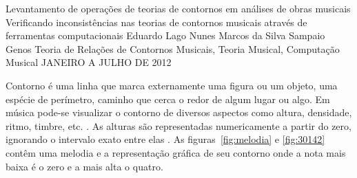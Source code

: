 \documentclass[11pt]{article}
\begin{document}
\graphicspath{{figs/}}


\dadosRelatorioFinal
{Levantamento de operações de teorias de contornos em análises de
  obras musicais}
{Verificando inconsistências nas teorias de contornos musicais através
  de ferramentas computacionais }
{Eduardo Lago Nunes}
{Marcos da Silva Sampaio}
{Genos}
{Teoria de Relações de Contornos Musicais, Teoria Musical, Computação Musical}
{JANEIRO A JULHO DE 2012}


\newpage

\setcounter{page}{1}
\onehalfspace

\label{sec:introducao}

Contorno é uma linha que marca externamente uma figura ou um objeto,
uma espécie de perímetro, caminho que cerca o redor de algum lugar ou
algo. Em música pode-se visualizar o contorno de diversos aspectos
como altura, densidade, ritmo, timbre, etc.
\cite[p. 01]{Sampaio2008}.
As alturas são representadas numericamente a partir do zero, 
ignorando o intervalo exato entre elas	.
As figuras~\ref{fig:melodia} e \ref{fig:30142} contêm uma melodia e a
representação gráfica de seu contorno onde a nota mais baixa é o zero e a mais 
alta o quatro.
\end{document}
